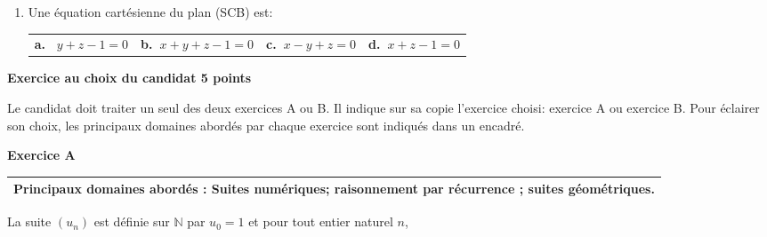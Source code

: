 \documentclass[10pt,a4paper,french]{article}
\newcommand{\R}{\mathbb{R}}
\newcommand{\N}{\mathbb{N}}
\begin{document}
\begin{enumerate}[resume]
{\begin{center}
\begin{tabularx}{\linewidth}{*{4}{X}}
$(t \in \R)$&\textbf{b.~} $\left\{\begin{array}{l !{=} r}x&-1+2t\\y&0\\z&1 + 2t
\end{array}\right.$

$(t \in \R)$&\textbf{c.~} $\left\{\begin{array}{l !{=} r}x&t\\y&0\\z&1+t
\end{array}\right.$

$(t \in \R)$&\textbf{d.~} $\left\{\begin{array}{l !{=} r}x&-1-t\\y&1+t\\z&1-t
\end{array}\right.$

$(t \in \R)$
\end{tabularx}
\end{center}}
\item Une équation cartésienne du plan (SCB) est:
\begin{center}
\begin{tabularx}{\linewidth}{*{4}{X}}
\textbf{a.~} $y+z-1 =0$ &\textbf{b.~}$x+y+z- 1=0$& \textbf{c.~}$x-y+z=0$&
\textbf{d.~}$x+z-1 =0$
\end{tabularx}
\end{center}
\end{enumerate}

\bigskip

\textbf{Exercice au choix du candidat \hfill 5 points}

\medskip

Le candidat doit traiter un seul des deux exercices A ou B.
Il indique sur sa copie l'exercice choisi: exercice A ou exercice B.
Pour éclairer son choix, les principaux domaines abordés par chaque exercice sont indiqués dans un encadré.

\medskip

\textbf{Exercice A}

\medskip

\begin{tabularx}{\linewidth}{|X|}\hline
\textbf{Principaux domaines abordés : Suites numériques; raisonnement par récurrence ; suites géométriques.}\\ \hline
\end{tabularx}

\medskip

La suite $\left(u_n\right)$ est définie sur $\N$ par $u_0 = 1$ et pour tout entier naturel $n$, 
\end{document}
